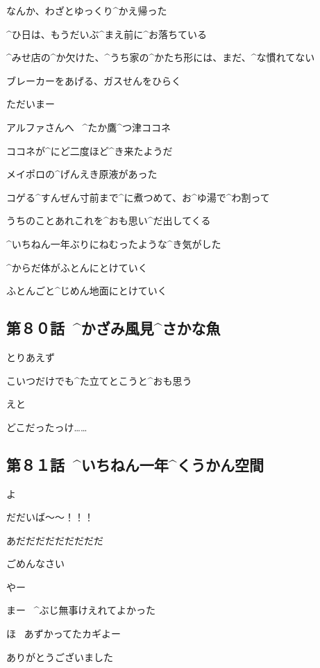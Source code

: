\page[30]
\Alpha なんか、わざとゆっくり^{かえ}{帰}った

\page
\Alpha ^{ひ}{日}は、もうだいぶ^{まえ}{前}に^{お}{落}ちている

\page
\Alpha ^{みせ}{店}の^{か}{欠}けた、^{うち}{家}の^{かたち}{形}には、まだ、^{な}{慣}れてない

\page
\Alpha ブレーカーをあげる、ガスせんをひらく

\Alpha ただいまー

\page
\Sign アルファさんへ
\ ^{たか}{鷹}^{つ}{津}ココネ

\page
\Alpha ココネが^{にど}{二度}ほど^{き}{来}たようだ

\page[37]
\Alpha メイポロの^{げんえき}{原液}があった

\Alpha コゲる^{すんぜん}{寸前}まで^{に}{煮}つめて、お^{ゆ}{湯}で^{わ}{割}って

\Alpha うちのことあれこれを^{おも}{思}い^{だ}{出}してくる

\page[41]
\Alpha ^{いちねん}{一年}ぶりにねむったような^{き}{気}がした

\Alpha ^{からだ}{体}がふとんにとけていく

\page
\Alpha ふとんごと^{じめん}{地面}にとけていく


\subsection{第８０話\ ^{かざみ}{風見}^{さかな}{魚}}

\page[46]
\Alpha とりあえず

\page
\Alpha こいつだけでも^{た}{立}てとこうと^{おも}{思}う

\Alpha えと

\Alpha どこだったっけ……


\subsection{第８１話\ ^{いちねん}{一年}^{くうかん}{空間}}

\page[56]
\Ojisan よ

\Alpha だだいば〜〜！！！

\Ojisan あだだだだだだだだだ

\page
\Alpha ごめんなさい

\Ojisan やー

\Ojisan まー
\ ^{ぶじ}{無事}けえれてよかった

\Ojisan ほ
\ あずかってたカギよー

\Alpha ありがとうございました

